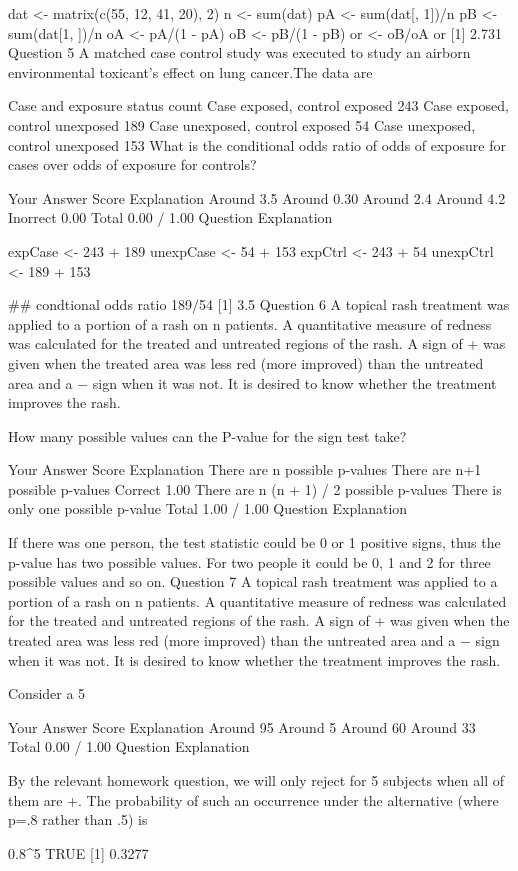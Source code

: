 dat <- matrix(c(55, 12, 41, 20), 2)
n <- sum(dat)
pA <- sum(dat[, 1])/n
pB <- sum(dat[1, ])/n
oA <- pA/(1 - pA)
oB <- pB/(1 - pB)
or <- oB/oA
or
[1] 2.731
Question 5
A matched case control study was executed to study an airborn environmental toxicant's effect on lung cancer.The data are

Case and exposure status	count
Case exposed, control exposed	243
Case exposed, control unexposed	189
Case unexposed, control exposed	54
Case unexposed, control unexposed	153
What is the conditional odds ratio of odds of exposure for cases over odds of exposure for controls?

Your Answer		Score	Explanation
Around 3.5			
Around 0.30			
Around 2.4			
Around 4.2	Inorrect	0.00	
Total		0.00 / 1.00	
Question Explanation

 expCase <- 243 + 189
unexpCase <- 54 + 153
expCtrl <- 243 + 54
unexpCtrl <- 189 + 153

## condtional odds ratio
189/54
[1] 3.5
Question 6
A topical rash treatment was applied to a portion of a rash on n patients. A quantitative measure of redness was calculated for the treated and untreated regions of the rash. A sign of + was given when the treated area was less red (more improved) than the untreated area and a − sign when it was not. It is desired to know whether the treatment improves the rash.

How many possible values can the P-value for the sign test take?

Your Answer		Score	Explanation
There are n possible p-values			
There are n+1 possible p-values	Correct	1.00	
There are n (n + 1) / 2 possible p-values			
There is only one possible p-value			
Total		1.00 / 1.00	
Question Explanation

If there was one person, the test statistic could be 0 or 1 positive signs, thus the p-value has two possible values. For two people it could be 0, 1 and 2 for three possible values and so on.
Question 7
A topical rash treatment was applied to a portion of a rash on n patients. A quantitative measure of redness was calculated for the treated and untreated regions of the rash. A sign of + was given when the treated area was less red (more improved) than the untreated area and a − sign when it was not. It is desired to know whether the treatment improves the rash.

Consider a 5%

Your Answer		Score	Explanation
Around 95%
Around 5%
Around 60%
Around 33%
Total		0.00 / 1.00	
Question Explanation

By the relevant homework question, we will only reject for 5 subjects when all of them are +. The probability of such an occurrence under the alternative (where p=.8 rather than .5) is

0.8^5
TRUE [1] 0.3277
